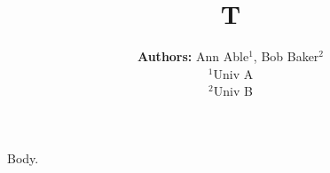 \documentclass{article}
\begin{document}
\title{T}
\author{{\bf Authors:} Ann Able$^{1}$, Bob Baker$^{2}$ \\ $^{1}$Univ A \\ $^{2}$Univ B}
\maketitle
Body.
\end{document}
